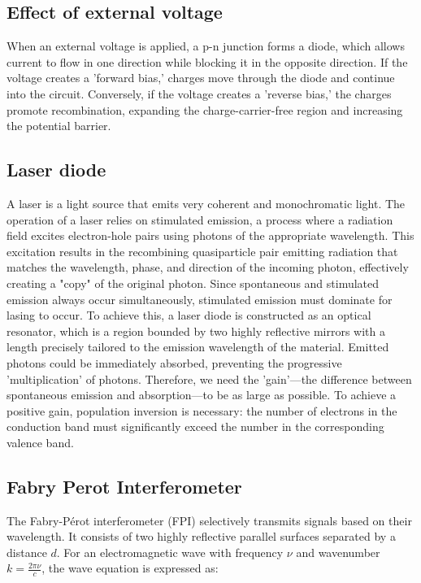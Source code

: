 \documentclass{article}
\begin{document}
\subsection{Effect of external voltage}
When an external voltage is applied, a p-n junction forms a diode, which allows current to flow in one direction while blocking it in the opposite direction. If the voltage creates a 'forward bias,' charges move through the diode and continue into the circuit. Conversely, if the voltage creates a 'reverse bias,' the charges promote recombination, expanding the charge-carrier-free region and increasing the potential barrier.

\subsection{Laser diode}
A laser is a light source that emits very coherent and monochromatic light. The operation of a laser relies on stimulated emission, a process where a radiation field excites electron-hole pairs using photons of the appropriate wavelength. This excitation results in the recombining quasiparticle pair emitting radiation that matches the wavelength, phase, and direction of the incoming photon, effectively creating a "copy" of the original photon. Since spontaneous and stimulated emission always occur simultaneously, stimulated emission must dominate for lasing to occur. To achieve this, a laser diode is constructed as an optical resonator, which is a region bounded by two highly reflective mirrors with a length precisely tailored to the emission wavelength of the material. Emitted photons could be immediately absorbed, preventing the progressive 'multiplication' of photons. Therefore, we need the 'gain'—the difference between spontaneous emission and absorption—to be as large as possible. To achieve a positive gain, population inversion is necessary: the number of electrons in the conduction band must significantly exceed the number in the corresponding valence band.

\pagebreak{}
\subsection{Fabry Perot Interferometer}

The Fabry-Pérot interferometer (FPI) selectively transmits signals based on their wavelength. It consists of two highly reflective parallel surfaces separated by a distance \(d\). For an electromagnetic wave with frequency \(\nu\) and wavenumber \(k = \frac{2\pi\nu}{c}\), the wave equation is expressed as:
\end{document}
